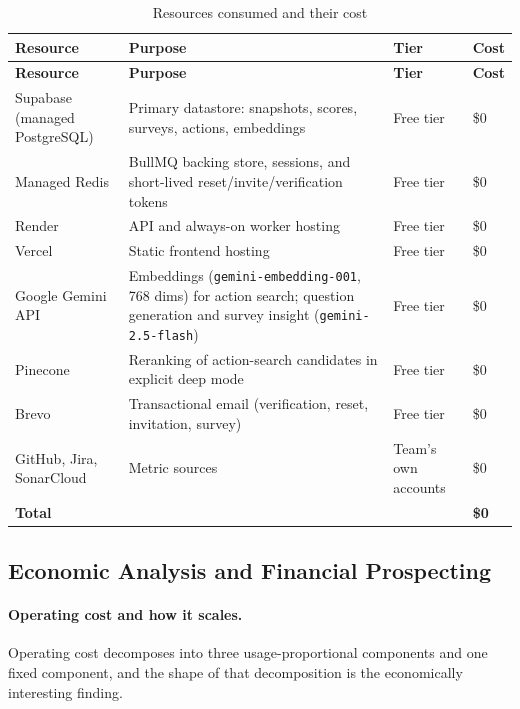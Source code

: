 \begin{longtable}{
  >{\raggedright\arraybackslash}p{}
  >{\raggedright\arraybackslash}p{}
  >{\raggedright\arraybackslash}p{}
  >{\raggedright\arraybackslash}p{}
}
\caption{Resources consumed and their cost}
\label{tab:budget}\\
\toprule
\textbf{Resource} & \textbf{Purpose} & \textbf{Tier} & \textbf{Cost} \\
\midrule
\endfirsthead
\toprule
\textbf{Resource} & \textbf{Purpose} & \textbf{Tier} & \textbf{Cost} \\
\midrule
\endhead
\bottomrule
\endlastfoot
Supabase (managed PostgreSQL) & Primary datastore: snapshots, scores, surveys,
actions, embeddings & Free tier & \$0 \\
\addlinespace
Managed Redis & BullMQ backing store, sessions, and short-lived
reset/invite/verification tokens & Free tier & \$0 \\
\addlinespace
Render & API and always-on worker hosting & Free tier & \$0 \\
\addlinespace
Vercel & Static frontend hosting & Free tier & \$0 \\
\addlinespace
Google Gemini API & Embeddings (\texttt{gemini-embedding-001}, 768 dims) for
action search; question generation and survey insight
(\texttt{gemini-2.5-flash}) & Free tier & \$0 \\
\addlinespace
Pinecone & Reranking of action-search candidates in explicit deep mode & Free
tier & \$0 \\
\addlinespace
Brevo & Transactional email (verification, reset, invitation, survey) & Free
tier & \$0 \\
\addlinespace
GitHub, Jira, SonarCloud & Metric sources & Team's own accounts & \$0 \\
\midrule
\textbf{Total} & & & \textbf{\$0} \\
\end{longtable}

\subsection{Economic Analysis and Financial Prospecting}
\label{subsec:economics}

\paragraph{Operating cost and how it scales.} Operating cost decomposes into
three usage-proportional components and one fixed component, and the shape of
that decomposition is the economically interesting finding.

